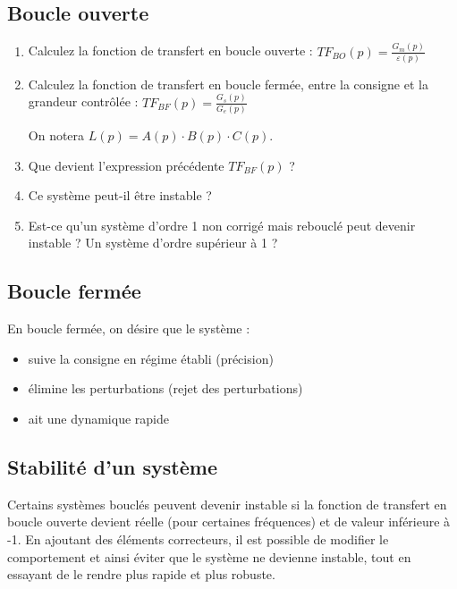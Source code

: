 \subsection*{Boucle ouverte}
\begin{enumerate}
	\item Calculez la fonction de transfert en boucle ouverte : $TF_{BO}(p) = \frac{G_m(p)}{\varepsilon{}(p)}$
	\item Calculez la fonction de transfert en boucle fermée, entre la consigne et la grandeur contrôlée : $TF_{BF}(p) = \frac{G_s(p)}{G_e(p)}$
	
	\medskip 
	
	On notera $L(p) = A(p) \cdot B(p) \cdot C(p)$.
	
	\item Que devient l'expression précédente $TF_{BF}(p)$ ?
	\item Ce système peut-il être instable ?
	\item Est-ce qu'un système d'ordre 1 non corrigé mais rebouclé peut devenir instable ? Un système d'ordre supérieur à 1 ?
\end{enumerate}

\subsection*{Boucle fermée}

En boucle fermée, on désire que le système :

\begin{itemize}
	\item suive la consigne en régime établi (précision)
	\item élimine les perturbations (rejet des perturbations)
	\item ait une dynamique rapide
\end{itemize}


\subsection*{Stabilité d'un système}

Certains systèmes bouclés peuvent devenir instable si la fonction de transfert en boucle ouverte devient réelle (pour certaines fréquences) et de valeur inférieure à -1. En ajoutant des éléments correcteurs, il est possible de modifier le comportement et ainsi éviter que le système ne devienne instable, tout en essayant de le rendre plus rapide et plus robuste. 

